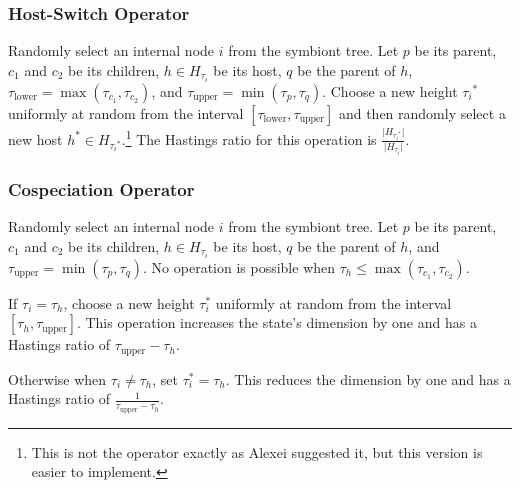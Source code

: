 \documentclass{article}
\begin{document}
            \subsubsection*{Host-Switch Operator}

                Randomly select an internal node $i$ from the symbiont tree.
                Let $p$ be its parent, $c_1$ and $c_2$ be its children, $h \in
                H_{\tau_i}$ be its host, $q$ be the parent of $h$,
                $\tau_\text{lower} = \max\left(\tau_{c_1},\tau_{c_2}\right)$,
                and $\tau_\text{upper} = \min\left(\tau_p,\tau_q\right)$.
                Choose a new height ${\tau_i}^*$ uniformly at random from
                the interval $\left[\tau_\text{lower},
                \tau_\text{upper}\right]$ and then randomly select a new host
                $h^* \in H_{{\tau_i}^*}.$\footnote{This is not the operator
                exactly as Alexei suggested it, but this version is easier to
                implement.} The Hastings ratio for this operation is
                $\frac{\lvert{H_{{\tau_i}^*}}\rvert}
                {\lvert{H_{\tau_i}}\rvert}$.

            \subsubsection*{Cospeciation Operator}

                Randomly select an internal node $i$ from the symbiont tree.
                Let $p$ be its parent, $c_1$ and $c_2$ be its children, $h \in
                H_{\tau_i}$ be its host, $q$ be the parent of $h$, and
                $\tau_\text{upper} = \min\left(\tau_p,\tau_q\right)$. No
                operation is possible when $\tau_h \leq
                \max\left(\tau_{c_1},\tau_{c_2}\right)$.

                If $\tau_i = \tau_h$, choose a new height $\tau_i^*$ uniformly
                at random from the interval $\left[\tau_h,
                \tau_\text{upper}\right]$. This operation increases the state's
                dimension by one and has a Hastings ratio of $\tau_\text{upper}
                - \tau_h$.

                Otherwise when $\tau_i \neq \tau_h$, set $\tau_i^* = \tau_h$.
                This reduces the dimension by one and has a Hastings ratio of
                $\frac{1}{\tau_\text{upper} - \tau_h}$.
\end{document}
